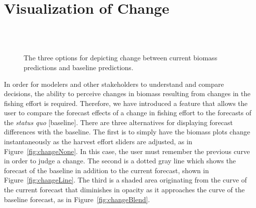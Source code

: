 \section{Visualization of Change}

\begin{figure}
\centering

 \\ 

 \\ 


	\caption[The three options for depicting change between current biomass predictions and baseline predictions]{The three options for depicting change between current biomass predictions and baseline predictions.}
	\label{fig:changeTypes}
\end{figure}

In order for modelers and other stakeholders to understand and compare decisions, the ability to perceive changes in biomass resulting from changes in the fishing effort is required.  Therefore, we have introduced a feature that allows the user to compare the forecast effects of a change in fishing effort to the forecasts of the \textit{status quo} [baseline]. There are three alternatives for displaying forecast differences with the baseline.  The first is to simply have the biomass plots change instantaneously as the harvest effort sliders are adjusted, as in Figure~\ref{fig:changeNone}.  In this case, the user must remember the previous curve in order to judge a change.  The second is a dotted gray line which shows the forecast of the baseline in addition to the current forecast, shown in Figure~\ref{fig:changeLine}.  The third is a shaded area originating from the curve of the current forecast that diminishes in opacity as it approaches the curve of the baseline forecast, as in Figure~\ref{fig:changeBlend}.

